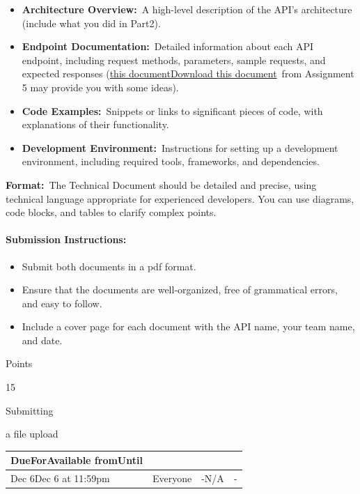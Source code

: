 \documentclass[
]{article}
\providecommand{\tightlist}{%
  \setlength{\itemsep}{0pt}\setlength{\parskip}{0pt}}
\begin{document}
\begin{itemize}
\tightlist
\item
  \textbf{Architecture Overview:}~A high-level description of the API's
  architecture (include what you did in Part2).
\item
  \textbf{Endpoint Documentation:}~Detailed information about each API
  endpoint, including request methods, parameters, sample requests, and
  expected responses
  (\href{https://instructure.charlotte.edu/courses/264138/files/33808130?wrap=1}{this
  document}\href{https://instructure.charlotte.edu/courses/264138/files/33808130/download?download_frd=1}{Download
  this document}~from Assignment 5 may provide you with some ideas).
\item
  \textbf{Code Examples:}~Snippets or links to significant pieces of
  code, with explanations of their functionality.
\item
  \textbf{Development Environment:}~Instructions for setting up a
  development environment, including required tools, frameworks, and
  dependencies.
\end{itemize}

\textbf{Format:}~The Technical Document should be detailed and precise,
using technical language appropriate for experienced developers. You can
use diagrams, code blocks, and tables to clarify complex points.

\paragraph{\texorpdfstring{\textbf{Submission
Instructions:}}{Submission Instructions:}}\label{submission-instructions}

\begin{itemize}
\tightlist
\item
  Submit both documents in a pdf format.
\item
  Ensure that the documents are well-organized, free of grammatical
  errors, and easy to follow.
\item
  Include a cover page for each document with the API name, your team
  name, and date.
\end{itemize}

Points

15

Submitting

a file upload

\begin{longtable}[]{@{}llll@{}}
\toprule\noalign{}
DueForAvailable fromUntil & & & \\
\midrule\noalign{}
\endhead
\bottomrule\noalign{}
\endlastfoot
Dec 6Dec 6 at 11:59pm & Everyone & -N/A & - \\
\end{longtable}
\end{document}
